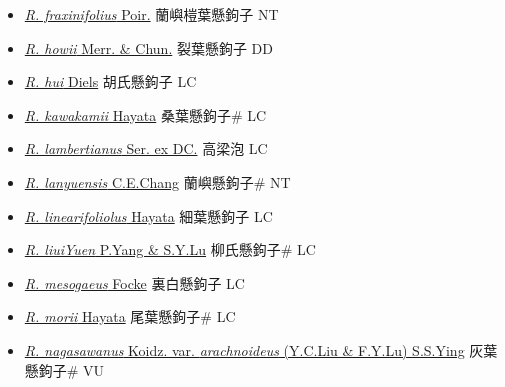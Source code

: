 \begin{itemize}
\begin{itemize}
        \item[] \href{http://www.theplantlist.org/tpl1.1/search?q=Rubus+fraxinifolius}{\textit{R. fraxinifolius} Poir.}   蘭嶼榿葉懸鉤子 NT
        \item[] \href{http://www.theplantlist.org/tpl1.1/search?q=Rubus+howii}{\textit{R. howii} Merr. \& Chun.}   裂葉懸鉤子 DD
        \item[] \href{http://www.theplantlist.org/tpl1.1/search?q=Rubus+hui}{\textit{R. hui} Diels}   胡氏懸鉤子 LC
        \item[] \href{http://www.theplantlist.org/tpl1.1/search?q=Rubus+kawakamii}{\textit{R. kawakamii} Hayata}   桑葉懸鉤子\# LC
        \item[] \href{http://www.theplantlist.org/tpl1.1/search?q=Rubus+lambertianus}{\textit{R. lambertianus} Ser. ex DC.}   高梁泡 LC
        \item[] \href{http://www.theplantlist.org/tpl1.1/search?q=Rubus+lanyuensis}{\textit{R. lanyuensis} C.E.Chang}   蘭嶼懸鉤子\# NT
        \item[] \href{http://www.theplantlist.org/tpl1.1/search?q=Rubus+linearifoliolus}{\textit{R. linearifoliolus} Hayata}   細葉懸鉤子 LC
        \item[] \href{http://www.theplantlist.org/tpl1.1/search?q=Rubus+liuiYuen}{\textit{R. liuiYuen} P.Yang \& S.Y.Lu}   柳氏懸鉤子\# LC
        \item[] \href{http://www.theplantlist.org/tpl1.1/search?q=Rubus+mesogaeus}{\textit{R. mesogaeus} Focke}   裏白懸鉤子 LC
        \item[] \href{http://www.theplantlist.org/tpl1.1/search?q=Rubus+morii}{\textit{R. morii} Hayata}   尾葉懸鉤子\# LC
        \item[] \href{http://www.theplantlist.org/tpl1.1/search?q=Rubus+nagasawanus+var.+arachnoideus}{\textit{R. nagasawanus} Koidz. var. \textit{arachnoideus} (Y.C.Liu \& F.Y.Lu) S.S.Ying}     灰葉懸鉤子\# VU

\end{itemize}
\end{itemize}
